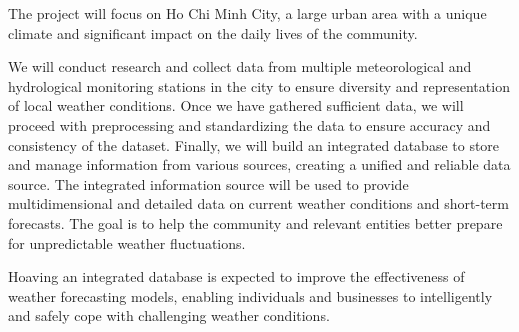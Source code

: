 The project will focus on Ho Chi Minh City, a large urban area with a unique climate and significant impact on the daily lives of the community.

We will conduct research and collect data from multiple meteorological and hydrological monitoring stations in the city to ensure diversity and representation of local weather conditions. Once we have gathered sufficient data, we will proceed with preprocessing and standardizing the data to ensure accuracy and consistency of the dataset. Finally, we will build an integrated database to store and manage information from various sources, creating a unified and reliable data source. The integrated information source will be used to provide multidimensional and detailed data on current weather conditions and short-term forecasts. The goal is to help the community and relevant entities better prepare for unpredictable weather fluctuations.

Hoaving an integrated database is expected to improve the effectiveness of weather forecasting models, enabling individuals and businesses to intelligently and safely cope with challenging weather conditions.